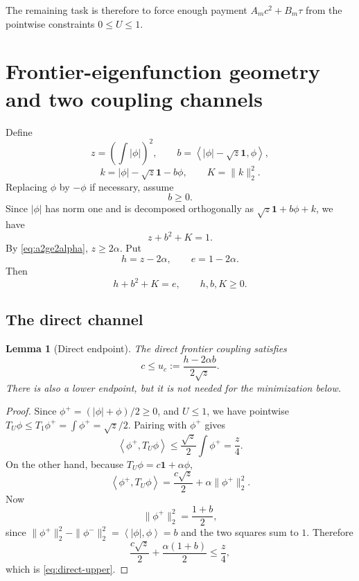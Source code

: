 \documentclass[11pt]{article}
\newtheorem{lemma}[theorem]{Lemma}
\newcommand{\one}{\mathbf 1}
\newcommand{\ip}[2]{\left\langle #1,#2\right\rangle}
\begin{document}
The remaining task is therefore to force enough payment
$A_mc^2+B_m\tau$ from the pointwise constraints $0\le U\le1$.

\section{Frontier-eigenfunction geometry and two coupling channels}

Define
\begin{equation}\label{eq:shape-defs}
        z=\left(\int|\phi|\right)^2,
        \qquad
        b=\ip{|\phi|-\sqrt z\one}{\phi},
\end{equation}
\[
        k=|\phi|-\sqrt z\one-b\phi,
        \qquad K=\|k\|_2^2.
\]
Replacing $\phi$ by $-\phi$ if necessary, assume
\begin{equation}\label{eq:bnonneg}
        b\ge0.
\end{equation}
Since $|\phi|$ has norm one and is decomposed orthogonally as
$\sqrt z\one+b\phi+k$, we have
\begin{equation}\label{eq:shape-budget}
        z+b^2+K=1.
\end{equation}
By \eqref{eq:a2ge2alpha}, $z\ge2\alpha$.  Put
\begin{equation}\label{eq:hdef}
        h=z-2\alpha,
        \qquad e=1-2\alpha.
\end{equation}
Then
\begin{equation}\label{eq:ebudget}
        h+b^2+K=e,
        \qquad h,b,K\ge0.
\end{equation}

\subsection{The direct channel}

\begin{lemma}[Direct endpoint]\label{lem:direct-endpoint}
The direct frontier coupling satisfies
\begin{equation}\label{eq:direct-upper}
        c\le u_c:=\frac{h-2\alpha b}{2\sqrt z}.
\end{equation}
There is also a lower endpoint, but it is not needed for the minimization
below.
\end{lemma}

\begin{proof}
Since $\phi^+=(|\phi|+\phi)/2\ge0$, and $U\le1$, we have pointwise
$T_U\phi\le T_1\phi^+=\int\phi^+=\sqrt z/2$.  Pairing with $\phi^+$ gives
\[
        \ip{\phi^+}{T_U\phi}\le \frac{\sqrt z}{2}\int\phi^+=\frac z4.
\]
On the other hand, because $T_U\phi=c\one+\alpha\phi$,
\[
        \ip{\phi^+}{T_U\phi}
        =\frac{c\sqrt z}{2}+\alpha\|\phi^+\|_2^2.
\]
Now
\[
        \|\phi^+\|_2^2=\frac{1+b}{2},
\]
since
$\|\phi^+\|_2^2-\|\phi^-\|_2^2=\ip{|\phi|}{\phi}=b$ and the two squares
sum to $1$.  Therefore
\[
        \frac{c\sqrt z}{2}+\frac{\alpha(1+b)}2\le\frac z4,
\]
which is \eqref{eq:direct-upper}.
\end{proof}
\end{document}
